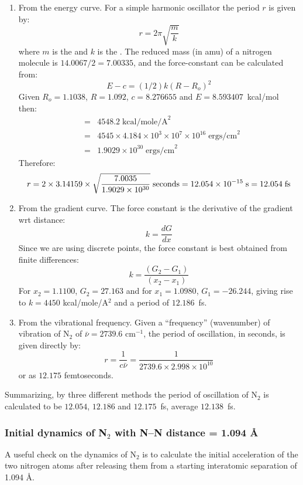 \begin{enumerate}
\item From the energy curve.
For a simple harmonic oscillator the period $r$ is given by:
$$ r = 2 \pi \sqrt{\frac{m}{k}}  $$
where $m$ is the  and $k$ is the . 
The  reduced  mass  (in amu)   of   a   nitrogen  molecule  is  
$14.0067/2  =  7.00335$,  and  the force-constant can be calculated from:
$$                 E-c = (1/2) k(R-R_o)^2 $$
Given $R_o = 1.1038$, $R = 1.092$, $c = 8.276655$ and $E = 8.593407$~kcal/mol
then:
\begin{eqnarray*}                      
& = & 4548.2 \; \mbox{kcal/mole/A}^2 \\
& = & 4545 \times 4.184 \times 10^3 \times 10^7 \times 10^{16}\; 
\mbox{ergs/cm}^2 \\
& = & 1.9029 \times 10^{30} \; \mbox{ergs/cm}^2
\end{eqnarray*}
Therefore:      
$$ r = 2 \times 3.14159 \times \sqrt{\frac{7.0035}{1.9029\times 10^{30}}}
\;{\rm seconds} = 12.054 \times 10^{-15}\;{\rm s} = 12.054\;{\rm fs} $$

\item From the gradient curve.
The force  constant  is  the  derivative  of  the  gradient  wrt
distance:
$$ k = \frac{dG}{dx} $$
Since we are using discrete points,  the  force  constant  is  best
obtained from finite differences:
$$ k = \frac{(G_2-G_1)}{(x_2-x_1)} $$
For $x_2 = 1.1100$, $G_2 = 27.163$ and for $x_1 =  1.0980$,  
$G_1  =  -26.244$,
giving rise to $k = 4450$ kcal/mole/A$^2$ and a period of $12.186$~fs.

\item From the vibrational frequency.
Given a ``frequency'' (wavenumber) of vibration of N$_2$ of $\bar{\nu}=2739.6$  
cm$^{-1}$,  the period of oscillation, in seconds, is given directly by:
$$ r = \frac{1}{c\bar{\nu}} = \frac{1}{2739.6 \times 2.998 \times 10^{10}} 
$$
or as $12.175$ femtoseconds.
\end{enumerate}

Summarizing, by three different methods the period  of  oscillation
of N$_2$  is calculated to be $12.054$, $12.186$ and $12.175$~fs, average
$12.138$~fs.

\subsubsection{Initial dynamics of N$_2$ with N--N distance = 1.094 \AA}

A useful check on the dynamics of N$_2$ is to  calculate  the  initial
acceleration  of  the  two  nitrogen  atoms  after releasing them from a
starting interatomic separation of 1.094 \AA.

